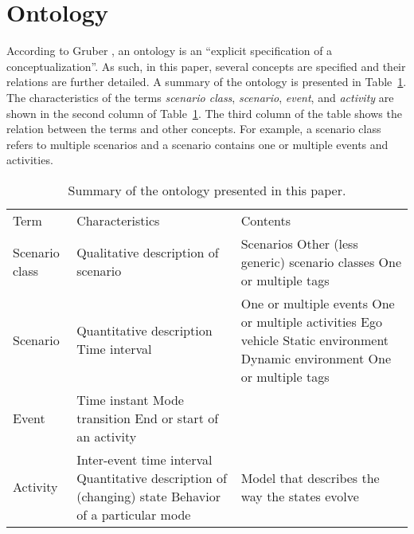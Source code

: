 \section{Ontology}
\label{sec:ontology}

According to Gruber \cite{gruber1993ontology}, an ontology is an ``explicit specification of a conceptualization''. As such, in this paper, several concepts are specified and their relations are further detailed. A summary of the ontology is presented in Table~\ref{tab:ontology}. The characteristics of the terms \emph{scenario class}, \emph{scenario}, \emph{event}, and \emph{activity} are shown in the second column of Table~\ref{tab:ontology}. The third column of the table shows the relation between the terms and other concepts. For example, a scenario class refers to multiple scenarios and a scenario contains one or multiple events and activities.

\begin{table}
	\centering
	\caption{Summary of the ontology presented in this paper.}
	\label{tab:ontology}
	\begin{tabularx}{\linewidth}{p{3em} X X}
		\toprule
		Term & Characteristics & Contents \\ \otoprule
		Scenario class & Qualitative description of scenario & Scenarios \newline Other (less generic) scenario classes \newline One or multiple tags \\
		Scenario & Quantitative description \newline Time interval & One or multiple events \newline One or multiple activities \newline Ego vehicle \newline Static environment \newline Dynamic environment \newline One or multiple tags \\
		Event & Time instant \newline Mode transition \newline End or start of an activity & \\
		Activity & Inter-event time interval \newline Quantitative description of (changing) state \newline Behavior of a particular mode & Model that describes the way the states evolve \\
		\bottomrule
	\end{tabularx}
\end{table}

